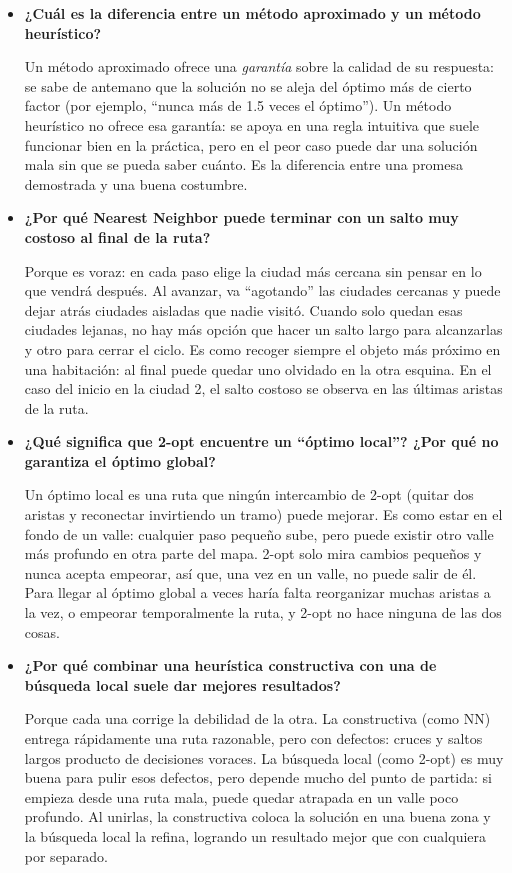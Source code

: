 \documentclass{article}
\begin{document}
\begin{itemize}
    \item \textbf{¿Cuál es la diferencia entre un método aproximado y un método heurístico?}

    Un método aproximado ofrece una \textit{garantía} sobre la calidad de su respuesta: se sabe de antemano que la solución no se aleja del óptimo más de cierto factor (por ejemplo, ``nunca más de 1.5 veces el óptimo''). Un método heurístico no ofrece esa garantía: se apoya en una regla intuitiva que suele funcionar bien en la práctica, pero en el peor caso puede dar una solución mala sin que se pueda saber cuánto. Es la diferencia entre una promesa demostrada y una buena costumbre.

    \item \textbf{¿Por qué Nearest Neighbor puede terminar con un salto muy costoso al final de la ruta?}

    Porque es voraz: en cada paso elige la ciudad más cercana sin pensar en lo que vendrá después. Al avanzar, va ``agotando'' las ciudades cercanas y puede dejar atrás ciudades aisladas que nadie visitó. Cuando solo quedan esas ciudades lejanas, no hay más opción que hacer un salto largo para alcanzarlas y otro para cerrar el ciclo. Es como recoger siempre el objeto más próximo en una habitación: al final puede quedar uno olvidado en la otra esquina. En el caso del inicio en la ciudad 2, el salto costoso se observa en las últimas aristas de la ruta.

    \item \textbf{¿Qué significa que 2-opt encuentre un ``óptimo local''? ¿Por qué no garantiza el óptimo global?}

    Un óptimo local es una ruta que ningún intercambio de 2-opt (quitar dos aristas y reconectar invirtiendo un tramo) puede mejorar. Es como estar en el fondo de un valle: cualquier paso pequeño sube, pero puede existir otro valle más profundo en otra parte del mapa. 2-opt solo mira cambios pequeños y nunca acepta empeorar, así que, una vez en un valle, no puede salir de él. Para llegar al óptimo global a veces haría falta reorganizar muchas aristas a la vez, o empeorar temporalmente la ruta, y 2-opt no hace ninguna de las dos cosas.

    \item \textbf{¿Por qué combinar una heurística constructiva con una de búsqueda local suele dar mejores resultados?}

    Porque cada una corrige la debilidad de la otra. La constructiva (como NN) entrega rápidamente una ruta razonable, pero con defectos: cruces y saltos largos producto de decisiones voraces. La búsqueda local (como 2-opt) es muy buena para pulir esos defectos, pero depende mucho del punto de partida: si empieza desde una ruta mala, puede quedar atrapada en un valle poco profundo. Al unirlas, la constructiva coloca la solución en una buena zona y la búsqueda local la refina, logrando un resultado mejor que con cualquiera por separado.


\end{itemize}
\end{document}
